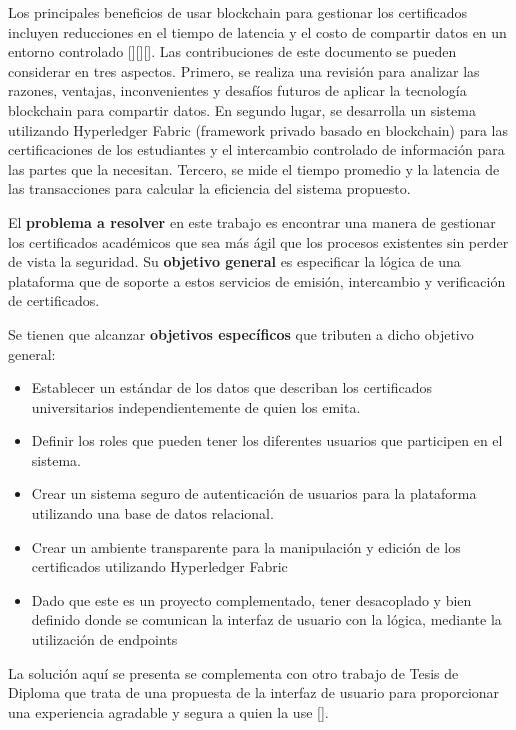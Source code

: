 Los principales beneficios de usar blockchain para gestionar los certificados incluyen reducciones en el tiempo de latencia y el costo de compartir datos en un entorno controlado [\cite{alammary2019blockchain}][\cite{azeez2021design}][\cite{aljazaery2022encryption}]. Las contribuciones de este documento se pueden considerar en tres aspectos. Primero, se realiza una revisión para analizar las razones, ventajas, inconvenientes y desafíos futuros de aplicar la tecnología blockchain para compartir datos. En segundo lugar, se desarrolla un sistema utilizando Hyperledger Fabric (framework privado basado en blockchain) para las certificaciones de los estudiantes y el intercambio controlado de información para las partes que la necesitan. Tercero, se mide el tiempo promedio y la latencia de las transacciones para calcular la eficiencia del sistema propuesto.

El \textbf{problema a resolver} en este trabajo es encontrar una manera de gestionar los certificados académicos que sea más ágil que los procesos existentes sin perder de vista la seguridad. Su \textbf{objetivo general} es especificar la lógica de una plataforma que de soporte a estos servicios de emisión, intercambio y verificación de certificados.

Se tienen que alcanzar \textbf{objetivos específicos} que tributen a dicho objetivo general:
\begin{itemize}
	\item Establecer un estándar de los datos que describan los certificados universitarios independientemente de quien los emita.
	\item Definir los roles que pueden tener los diferentes usuarios que participen en el sistema.
	\item Crear un sistema seguro de autenticación de usuarios para la plataforma utilizando una base de datos relacional.
	\item Crear un ambiente transparente para la manipulación y edición de los certificados utilizando Hyperledger Fabric
	\item Dado que este es un proyecto complementado, tener desacoplado y bien definido donde se comunican la interfaz de usuario con la lógica, mediante la utilización de endpoints   
\end{itemize}

La solución aquí se presenta  se complementa con otro trabajo de Tesis de Diploma que trata de una propuesta de la interfaz de usuario para proporcionar una experiencia agradable y segura a quien la use [\cite{arie}].


